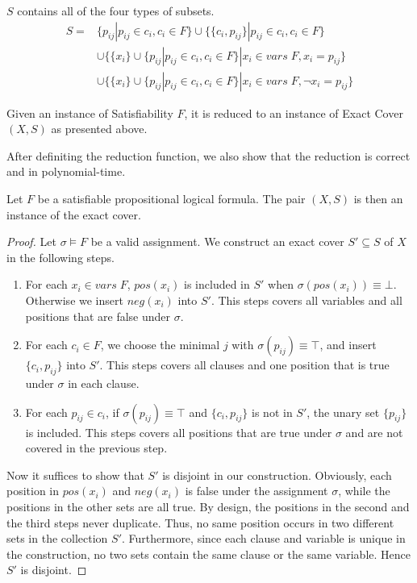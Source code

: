 $S$ contains all of the four types of subsets.
\begin{align*}
    S =& \{{p_{ij}} | p_{ij} \in c_i, c_i \in F \} 
    \cup \{\{c_i, p_{ij}\} | p_{ij} \in c_i, c_i \in F \} \\
    &\cup \{\{x_i\} \cup \{p_{ij} | p_{ij} \in c_i, c_i \in F\} | x_i \in vars\; F, x_i = p_{ij}\}\\
    &\cup \{\{x_i\} \cup \{p_{ij} | p_{ij} \in c_i, c_i \in F\} | x_i \in vars\; F, \neg x_i = p_{ij}\}
\end{align*}
\begin{definition}
    Given an instance of Satisfiability $F$, 
    it is reduced to an instance of Exact Cover $(X, S)$ as presented above.
\end{definition}
After definiting the reduction function,
we also show that the reduction is correct and in polynomial-time.
\begin{lemma}[Soundess]
    Let $F$ be a satisfiable propositional logical formula. The pair $(X, S)$ is then an instance of the exact cover.
\end{lemma}
\begin{proof}
    Let $\sigma \models F$ be a valid assignment. We construct an exact cover $S' \subseteq S$ of $X$ in the following steps.
\begin{enumerate}
    \item For each $x_i \in vars\; F$, $pos(x_i)$ is included in $S'$ when $\sigma(pos(x_i)) \equiv \bot$. Otherwise we insert $neg(x_i)$ into $S'$.
    This steps covers all variables and all positions that are false under $\sigma$.
    \item For each $c_i \in F$, we choose the minimal $j$ with $\sigma(p_{ij}) \equiv \top$, and insert $\{c_i, p_{ij}\}$ into $S'$.
    This steps covers all clauses and one position that is true under $\sigma$ in each clause.
    \item For each $p_{ij} \in c_i$, if $\sigma(p_{ij}) \equiv \top$ and $\{c_i, p_{ij}\}$ is not in $S'$, the unary set $\{p_{ij}\}$ is included. 
    This steps covers all positions that are true under $\sigma$ and are not covered in the previous step.
\end{enumerate}
Now it suffices to show that $S'$ is disjoint in our construction.
Obviously, each position in $pos(x_i)$ and $neg(x_i)$ is false under the assignment $\sigma$, 
while the positions in the other sets are all true. By design, the positions in the second and the third steps never duplicate. 
Thus, no same position occurs in two different sets in the collection $S'$. 
Furthermore, since each clause and variable is unique in the construction, no two sets contain the same clause or the same variable.
Hence $S'$ is disjoint.
\end{proof}
